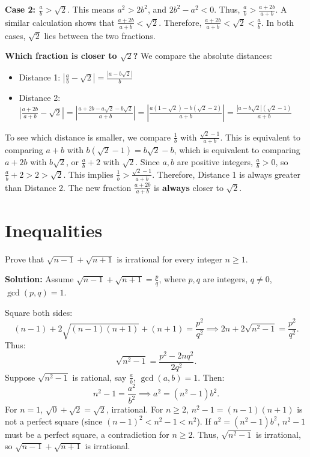 \textbf{Case 2: $\frac{a}{b} > \sqrt{2}$}. This means $a^2 > 2b^2$, and $2b^2 - a^2 < 0$.
Thus, $\frac{a}{b} > \frac{a+2b}{a+b}$. A similar calculation shows that $\frac{a+2b}{a+b} < \sqrt{2}$.
Therefore, $\frac{a+2b}{a+b} < \sqrt{2} < \frac{a}{b}$. In both cases, $\sqrt{2}$ lies between the two fractions.

\textbf{Which fraction is closer to $\sqrt{2}$?}
We compare the absolute distances:
\begin{itemize}
\item Distance 1: $\left|\frac{a}{b} - \sqrt{2}\right| = \frac{|a - b\sqrt{2}|}{b}$
\item Distance 2: $\left|\frac{a + 2b}{a + b} - \sqrt{2}\right| = \left|\frac{a + 2b - a\sqrt{2} - b\sqrt{2}}{a + b}\right| = \left|\frac{a(1-\sqrt{2}) - b(\sqrt{2}-2)}{a + b}\right| = \frac{|a - b\sqrt{2}|(\sqrt{2}-1)}{a+b}$
\end{itemize}
To see which distance is smaller, we compare $\frac{1}{b}$ with $\frac{\sqrt{2}-1}{a+b}$.
This is equivalent to comparing $a+b$ with $b(\sqrt{2}-1) = b\sqrt{2} - b$, which is equivalent to comparing $a+2b$ with $b\sqrt{2}$, or $\frac{a}{b} + 2$ with $\sqrt{2}$.
Since $a, b$ are positive integers, $\frac{a}{b} > 0$, so $\frac{a}{b} + 2 > 2 > \sqrt{2}$.
This implies $\frac{1}{b} > \frac{\sqrt{2}-1}{a+b}$.
Therefore, Distance 1 is always greater than Distance 2. The new fraction $\frac{a+2b}{a+b}$ is \textbf{always} closer to $\sqrt{2}$.

\section{Inequalities}

\begin{problembox}
Prove that $\sqrt{n - 1} + \sqrt{n + 1}$ is irrational for every integer $n \geq 1$.
\end{problembox}

\textbf{Solution:}
Assume $\sqrt{n - 1} + \sqrt{n + 1} = \frac{p}{q}$, where $p, q$ are integers, $q \neq 0$, $\gcd(p, q) = 1$.

Square both sides:
\[
(n - 1) + 2\sqrt{(n - 1)(n + 1)} + (n + 1) = \frac{p^2}{q^2} \implies 2n + 2\sqrt{n^2 - 1} = \frac{p^2}{q^2}.
\]
Thus:
\[
\sqrt{n^2 - 1} = \frac{p^2 - 2n q^2}{2 q^2}.
\]
Suppose $\sqrt{n^2 - 1}$ is rational, say $\frac{a}{b}$, $\gcd(a, b) = 1$. Then:
\[
n^2 - 1 = \frac{a^2}{b^2} \implies a^2 = (n^2 - 1)b^2.
\]
For $n = 1$, $\sqrt{0} + \sqrt{2} = \sqrt{2}$, irrational. For $n \geq 2$, $n^2 - 1 = (n - 1)(n + 1)$ is not a perfect square (since $(n - 1)^2 < n^2 - 1 < n^2$). If $a^2 = (n^2 - 1)b^2$, $n^2 - 1$ must be a perfect square, a contradiction for $n \geq 2$. Thus, $\sqrt{n^2 - 1}$ is irrational, so $\sqrt{n - 1} + \sqrt{n + 1}$ is irrational.

